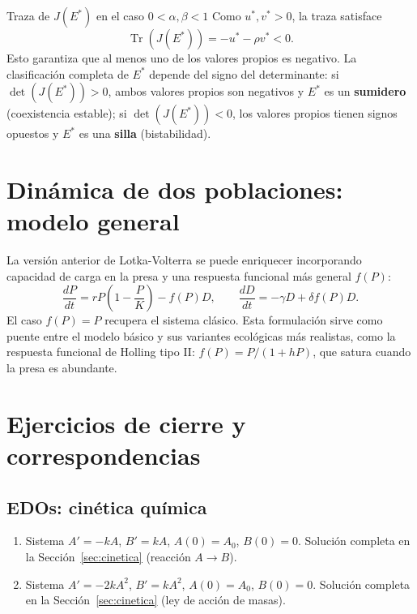 \documentclass[11pt,letterpaper]{article}
\begin{document}
\begin{observacion}{Traza de $J(E^*)$ en el caso $0<\alpha,\beta<1$}{}
Como $u^*,v^*>0$, la traza satisface
\[
\operatorname{Tr}(J(E^*))=-u^*-\rho v^*<0.
\]
Esto garantiza que al menos uno de los valores propios es negativo. La clasificación completa de $E^*$ depende del signo del determinante:
si $\det(J(E^*))>0$, ambos valores propios son negativos y $E^*$ es un \textbf{sumidero} (coexistencia estable);
si $\det(J(E^*))<0$, los valores propios tienen signos opuestos y $E^*$ es una \textbf{silla} (bistabilidad).
\end{observacion}


\section{Dinámica de dos poblaciones: modelo general}
\label{sec:modelo-general-dos-poblaciones}

La versión anterior de Lotka-Volterra se puede enriquecer incorporando
capacidad de carga en la presa y una respuesta funcional más general $f(P)$:
\[
\frac{dP}{dt}=rP\!\left(1-\frac{P}{K}\right)-f(P)D,\qquad
\frac{dD}{dt}=-\gamma D+\delta f(P)D.
\]
El caso $f(P)=P$ recupera el sistema clásico. Esta formulación sirve como
puente entre el modelo básico y sus variantes ecológicas más realistas, como
la respuesta funcional de Holling tipo II: $f(P)=P/(1+hP)$, que satura
cuando la presa es abundante.

\section{Ejercicios de cierre y correspondencias}
\label{sec:tarea-referencia}

\subsection{EDOs: cinética química}

\begin{enumerate}
\item Sistema $A'=-kA$, $B'=kA$, $A(0)=A_0$, $B(0)=0$.
      Solución completa en la Sección~\ref{sec:cinetica} (reacción $A\to B$).
\item Sistema $A'=-2kA^2$, $B'=kA^2$, $A(0)=A_0$, $B(0)=0$.
      Solución completa en la Sección~\ref{sec:cinetica} (ley de acción de masas).
\end{enumerate}
\end{document}
